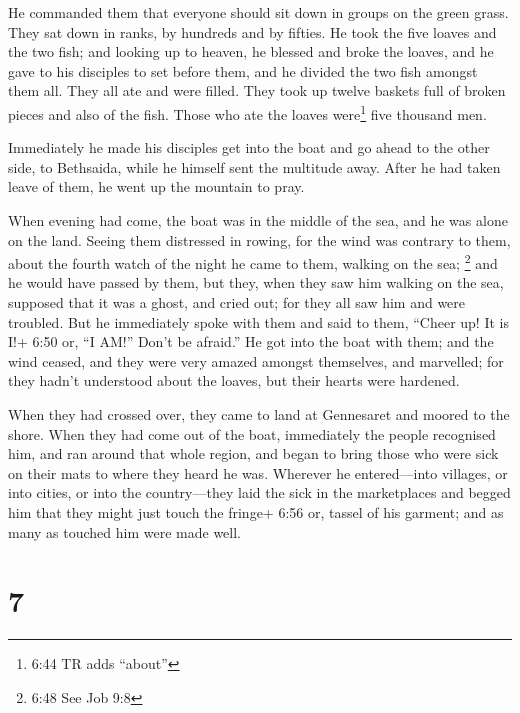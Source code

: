  He commanded them that everyone should sit down in groups
on the green grass.  They sat down in ranks, by hundreds
and by fifties.  He took the five loaves and the two fish;
and looking up to heaven, he blessed and broke the loaves, and he gave
to his disciples to set before them, and he divided the two fish amongst
them all.  They all ate and were filled.  They
took up twelve baskets full of broken pieces and also of the fish.
 Those who ate the loaves were\footnote{6:44 TR adds
  ``about''} five thousand men.

 Immediately he made his disciples get into the boat and go
ahead to the other side, to Bethsaida, while he himself sent the
multitude away.  After he had taken leave of them, he went
up the mountain to pray.

 When evening had come, the boat was in the middle of the
sea, and he was alone on the land.  Seeing them distressed
in rowing, for the wind was contrary to them, about the fourth watch of
the night he came to them, walking on the sea; \footnote{6:48 See Job
  9:8} and he would have passed by them,  but they, when
they saw him walking on the sea, supposed that it was a ghost, and cried
out;  for they all saw him and were troubled. But he
immediately spoke with them and said to them, ``Cheer up! It is I!+ 6:50
or, ``I AM!'' Don't be afraid.''  He got into the boat with
them; and the wind ceased, and they were very amazed amongst themselves,
and marvelled;  for they hadn't understood about the
loaves, but their hearts were hardened.

 When they had crossed over, they came to land at
Gennesaret and moored to the shore.  When they had come out
of the boat, immediately the people recognised him,  and
ran around that whole region, and began to bring those who were sick on
their mats to where they heard he was.  Wherever he
entered---into villages, or into cities, or into the country---they laid
the sick in the marketplaces and begged him that they might just touch
the fringe+ 6:56 or, tassel of his garment; and as many as touched him
were made well.

\hypertarget{section-6}{%
\section{7}\label{section-6}}

